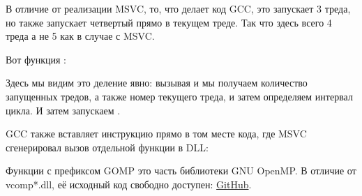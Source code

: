 В отличие от реализации MSVC, то, что делает код GCC, это запускает 3 треда, но также запускает 
четвертый прямо в текущем треде. Так что здесь всего 4 треда а не 5 как в случае
с MSVC.

Вот функция :
 


Здесь мы видим это деление явно: вызывая 
 и 
мы получаем количество запущенных тредов, а также номер текущего треда, и затем определяем интервал цикла.
И затем запускаем .

GCC также вставляет инструкцию  
прямо в том месте кода, где MSVC сгенерировал вызов отдельной функции в DLL:



Функции с префиксом GOMP это часть библиотеки 
GNU OpenMP.
В отличие от vcomp*.dll, её исходный код свободно доступен: 
\href{http://go.yurichev.com/17102}{GitHub}.

